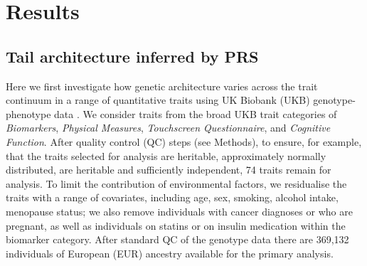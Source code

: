 \documentclass[12pt]{zHenriquesLab-StyleBioRxiv}
\begin{document}
% 
% 
% 
% 
% 
% 
% 
% 
% 
% 
% 
% 
% 
%
% 
% 
% 
% 
% 
% 
% 
% 
% 
% 
% 
% 
% 
% 
% 
% 
% 
% 
% 
\section*{Results} \label{sec:results} 
\subsection*{Tail architecture inferred by PRS} 
Here we first investigate how genetic architecture 
varies across the trait continuum in a range of 
quantitative traits using UK Biobank (UKB) 
genotype-phenotype data \cite{Bycroft2018}. We consider traits 
from the broad UKB trait categories of \emph{Biomarkers}, 
\emph{Physical Measures}, \emph{Touchscreen Questionnaire}, and \emph{Cognitive Function}. 
After quality control (QC) steps (see Methods), to ensure, for example, 
that the traits selected for analysis are heritable, approximately normally distributed, 
are heritable and sufficiently independent, 74 traits remain for analysis. 
To limit the contribution of environmental factors, we 
residualise the traits with a range of covariates, including 
age, sex, smoking, alcohol intake, menopause status; 
we also remove individuals with cancer diagnoses or who 
are pregnant, as well as individuals on statins or on 
insulin medication within the biomarker category. 
After standard QC of the genotype data
there are 369,132 individuals of European (EUR)
ancestry available for the primary analysis.
\end{document}
